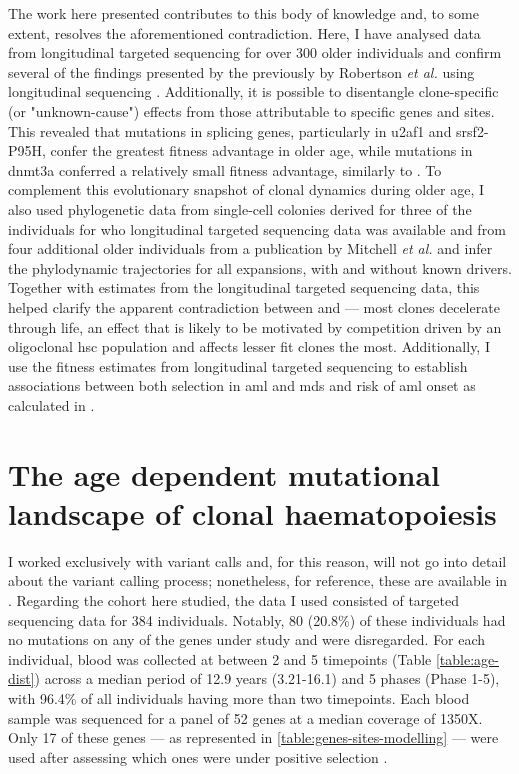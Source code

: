 The work here presented contributes to this body of knowledge and, to some extent, resolves the aforementioned contradiction. Here, I have analysed data from longitudinal targeted sequencing for over 300 older individuals and confirm several of the findings presented by the previously by Robertson \textit{et al.} using longitudinal sequencing \cite{Robertson2021-sw}. Additionally, it is possible to disentangle clone-specific (or "unknown-cause") effects from those attributable to specific genes and sites. This revealed that mutations in splicing genes, particularly in \ac{u2af1} and \ac{srsf2}-P95H, confer the greatest fitness advantage in older age, while mutations in \ac{dnmt3a} conferred a relatively small fitness advantage, similarly to \cite{Robertson2021-sw}. To complement this evolutionary snapshot of clonal dynamics during older age, I also used phylogenetic data from single-cell colonies derived for three of the individuals for who longitudinal targeted sequencing data was available and from four additional older individuals from a publication by Mitchell \textit{et al.} \cite{Mitchell2021-zl} and infer the phylodynamic trajectories for all expansions, with and without known drivers. Together with estimates from the longitudinal targeted sequencing data, this helped clarify the apparent contradiction between \cite{Robertson2021-sw} and \cite{Watson2020-pz} --- most clones decelerate through life, an effect that is likely to be motivated by competition driven by an oligoclonal \ac{hsc} population and affects lesser fit clones the most. Additionally, I use the fitness estimates from longitudinal targeted sequencing to establish associations between both selection in \ac{aml} and \ac{mds} and risk of \ac{aml} onset as calculated in \cite{Abelson2018-wh}.

\section{The age dependent mutational landscape of clonal haematopoiesis}

I worked exclusively with variant calls and, for this reason, will not go into detail about the variant calling process; nonetheless, for reference, these are available in \cite{Fabre2021-uw}. Regarding the cohort here studied, the data I used consisted of targeted sequencing data for 384 individuals. Notably, 80 (20.8\%) of these individuals had no mutations on any of the genes under study and were disregarded. For each individual, blood was collected at between 2 and 5 timepoints (Table \ref{table:age-dist}) across a median period of 12.9 years (3.21-16.1) and 5 phases (Phase 1-5), with 96.4\% of all individuals having more than two timepoints. Each blood sample was sequenced for a panel of 52 genes at a median coverage of 1350X. Only 17 of these genes --- as represented in \ref{table:genes-sites-modelling} --- were used after assessing which ones were under positive selection \cite{Fabre2021-uw,Martincorena2017-ii}.

